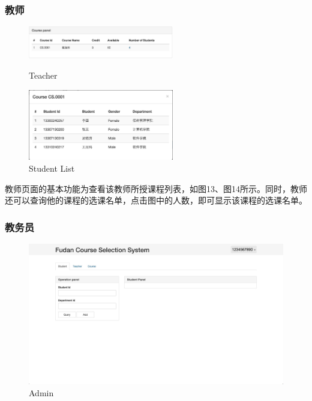 \documentclass[a4paper, 11pt, nofonts, nocap, fancyhdr]{ctexart}
\begin{document}
\newpage
\subsubsection{教师}

	\begin{figure}[h]
		\begin{minipage}{0.5\textwidth}
			\centering
			\includegraphics[width=2.5in]{teacher}
			\caption{Teacher}
		\end{minipage}%
		\begin{minipage}{0.5\textwidth}
			\centering
			\includegraphics[width=2.5in]{adteacou}
			\caption{Student List}
		\end{minipage}
	\end{figure}

	教师页面的基本功能为查看该教师所授课程列表，如图13、图14所示。同时，教师还可以查询他的课程的选课名单，点击图中的人数，即可显示该课程的选课名单。

\newpage
\subsubsection{教务员}

	\begin{figure}[h]
		\centering
		\includegraphics[width=6in]{adover}
		\caption{Admin}
	\end{figure}
\end{document}

